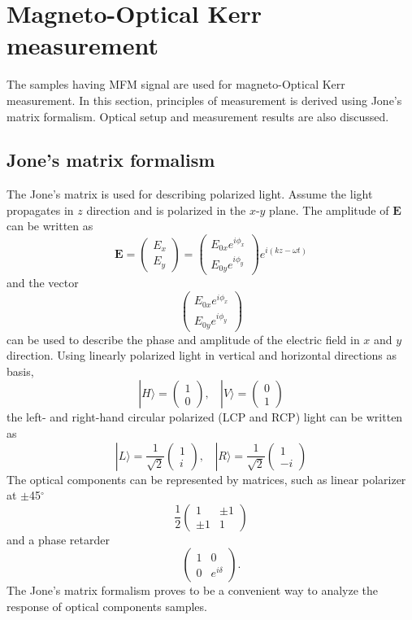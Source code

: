 \documentclass[pdflatex, sectionletters, 12pt]{pittetd}    %
\begin{document}
\section{Magneto-Optical Kerr measurement}

The samples having MFM signal are used for magneto-Optical Kerr measurement. In this section, principles of measurement is derived using Jone's matrix formalism. Optical setup and measurement results are also discussed.

\subsection{Jone's matrix formalism}

The Jone's matrix is used for describing polarized light. Assume the light propagates in $z$ direction and is polarized in the $x$-$y$ plane. The amplitude of $\mathbf{E}$ can be written as
$$
\mathbf{E} = 
\begin{pmatrix}
E_x \\
E_y
\end{pmatrix}
=
\begin{pmatrix}
E_{0x} e^{i\phi_x} \\
E_{0y} e^{i\phi_y}
\end{pmatrix}
e^{i(kz - \omega t)}
$$
and the vector 
$$
\begin{pmatrix}
E_{0x} e^{i\phi_x} \\
E_{0y} e^{i\phi_y}
\end{pmatrix}
$$
can be used to describe the phase and amplitude of the electric field in $x$ and $y$ direction. Using linearly polarized light in vertical and horizontal directions as basis, 
$$
|H \rangle = 
\begin{pmatrix}
1 \\
0
\end{pmatrix}, \ \ \ \
|V \rangle = 
\begin{pmatrix}
0 \\
1
\end{pmatrix}
$$
the left- and right-hand circular polarized (LCP and RCP) light can be written as
$$
|L \rangle = \frac{1}{\sqrt{2}}
\begin{pmatrix}
1 \\
i
\end{pmatrix}, \ \ \ \
|R \rangle = \frac{1}{\sqrt{2}}
\begin{pmatrix}
1 \\
-i
\end{pmatrix}
$$
The optical components can be represented by matrices, such as linear polarizer at $\pm$45$^{\circ}$
$$
\frac{1}{2}
\begin{pmatrix}
1 & \pm 1 \\
\pm 1 & 1
\end{pmatrix}
$$
and a phase retarder
$$
\begin{pmatrix}
1 & 0 \\
0 & e^{i\delta}
\end{pmatrix}.
$$
The Jone's matrix formalism proves to be a convenient way to analyze the response of optical components samples.
\end{document}
